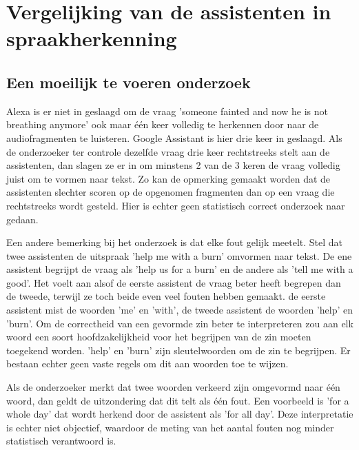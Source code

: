 \section{Vergelijking van de assistenten in spraakherkenning}
\subsection{Een moeilijk te voeren onderzoek}
\label{ss:een moeilijk te voeren onderzoek}
Alexa is er niet in geslaagd om de vraag 'someone fainted and now he is not breathing anymore' ook maar één keer volledig te herkennen door naar de audiofragmenten te luisteren. Google Assistant is hier drie keer in geslaagd. Als de onderzoeker ter controle dezelfde vraag drie keer rechtstreeks stelt aan de assistenten, dan slagen ze er in om minstens 2 van de 3 keren de vraag volledig juist om te vormen naar tekst. Zo kan de opmerking gemaakt worden dat de assistenten slechter scoren op de opgenomen fragmenten dan op een vraag die rechtstreeks wordt gesteld. Hier is echter geen statistisch correct onderzoek naar gedaan.

Een andere bemerking bij het onderzoek is dat elke fout gelijk meetelt. Stel dat twee assistenten de uitspraak 'help me with a burn' omvormen naar tekst. De ene assistent begrijpt de vraag als 'help us for a burn' en de andere als 'tell me with a good'. Het voelt aan alsof de eerste assistent de vraag beter heeft begrepen dan de tweede, terwijl ze toch beide even veel fouten hebben gemaakt. de eerste assistent mist de woorden 'me' en 'with', de tweede assistent de woorden 'help' en 'burn'. Om de correctheid van een gevormde zin beter te interpreteren zou aan elk woord een soort hoofdzakelijkheid voor het begrijpen van de zin moeten toegekend worden. 'help' en 'burn' zijn sleutelwoorden om de zin te begrijpen. Er bestaan echter geen vaste regels om dit aan woorden toe te wijzen.

Als de onderzoeker merkt dat twee woorden verkeerd zijn omgevormd naar één woord, dan geldt de uitzondering dat dit telt als één fout. Een voorbeeld is 'for a whole day' dat wordt herkend door de assistent als 'for all day'. Deze interpretatie is echter niet objectief, waardoor de meting van het aantal fouten nog minder statistisch verantwoord is.

